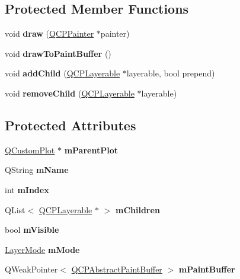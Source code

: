 \subsection*{Protected Member Functions}
\begin{DoxyCompactItemize}
\item 
\mbox{\label{classQCPLayer_ab831a99c8d30b15ec4533ca341e8813b}} 
void {\bfseries draw} (\hyperlink{classQCPPainter}{Q\+C\+P\+Painter} $\ast$painter)
\item 
\mbox{\label{classQCPLayer_a4a8e0a86f31462299e7fc8e8158dd2c6}} 
void {\bfseries draw\+To\+Paint\+Buffer} ()
\item 
\mbox{\label{classQCPLayer_a57ce5e49364aa9122276d5df3b4a0ddc}} 
void {\bfseries add\+Child} (\hyperlink{classQCPLayerable}{Q\+C\+P\+Layerable} $\ast$layerable, bool prepend)
\item 
\mbox{\label{classQCPLayer_ac2f64ac7761650582d968d86670ef362}} 
void {\bfseries remove\+Child} (\hyperlink{classQCPLayerable}{Q\+C\+P\+Layerable} $\ast$layerable)
\end{DoxyCompactItemize}
\subsection*{Protected Attributes}
\begin{DoxyCompactItemize}
\item 
\mbox{\label{classQCPLayer_a2f3374a7884bf403720cd1cf6f7ad1bb}} 
\hyperlink{classQCustomPlot}{Q\+Custom\+Plot} $\ast$ {\bfseries m\+Parent\+Plot}
\item 
\mbox{\label{classQCPLayer_a91e6298183cb4b9dfd4efdfaf1ecc220}} 
Q\+String {\bfseries m\+Name}
\item 
\mbox{\label{classQCPLayer_a122088bcab6cec76a52b75ce8606605b}} 
int {\bfseries m\+Index}
\item 
\mbox{\label{classQCPLayer_a704aa71bba469383c3a3c598c1ec0d28}} 
Q\+List$<$ \hyperlink{classQCPLayerable}{Q\+C\+P\+Layerable} $\ast$ $>$ {\bfseries m\+Children}
\item 
\mbox{\label{classQCPLayer_a264950deb08e589460c126c895a1e2b5}} 
bool {\bfseries m\+Visible}
\item 
\mbox{\label{classQCPLayer_a11bd0aa190d8fa21c8c7673d070737c8}} 
\hyperlink{classQCPLayer_a67dcfc1590be2a1f2227c5a39bb59c7c}{Layer\+Mode} {\bfseries m\+Mode}
\item 
\mbox{\label{classQCPLayer_aa0bdbc75e4350a0669ff515b3476a3d3}} 
Q\+Weak\+Pointer$<$ \hyperlink{classQCPAbstractPaintBuffer}{Q\+C\+P\+Abstract\+Paint\+Buffer} $>$ {\bfseries m\+Paint\+Buffer}
\end{DoxyCompactItemize}
